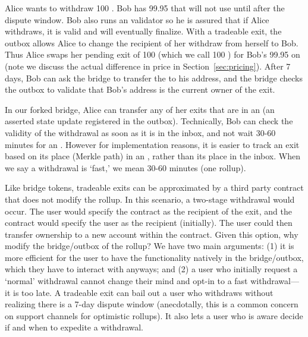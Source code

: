 Alice wants to withdraw 100 \ethtwo. Bob has 99.95 \ethone that will not use until after the dispute window. Bob also runs an \layertwo validator so he is assured that if Alice withdraws, it is valid and will eventually finalize. With a tradeable exit, the outbox allows Alice to change the recipient of her withdraw from herself to Bob. Thus Alice swaps her pending exit of 100 \ethone (which we call 100 \ethxx) for Bob's 99.95 \ethone on \layerone (note we discuss the actual difference in price in Section~\ref{sec:pricing}). After 7 days, Bob can ask the bridge to transfer the \ethone to his address, and the bridge checks the outbox to validate that Bob's address is the current owner of the exit.

In our forked bridge, Alice can transfer any of her exits that are in an \rblock (\ie an asserted \layertwo state update registered in the outbox). Technically, Bob can check the validity of the withdrawal as soon as it is in the inbox, and not wait 30-60 minutes for an \rblock. However for implementation reasons, it is easier to track an exit based on its place (\ie Merkle path) in an \rblock, rather than its place in the inbox. When we say a withdrawal is `fast,' we mean 30-60 minutes (\ie one \layertwo rollup). 

Like bridge tokens, tradeable exits can be approximated by a third party \layerone contract that does not modify the rollup. In this scenario, a two-stage withdrawal would occur. The user would specify the contract as the recipient of the exit, and the contract would specify the user as the recipient (initially). The user could then transfer ownership to a new account within the contract. Given this option, why modify the bridge/outbox of the rollup? We have two main arguments: (1) it is more efficient for the user to have the functionality natively in the bridge/outbox, which they have to interact with anyways; and (2) a user who initially request a `normal' withdrawal cannot change their mind and opt-in to a fast withdrawal---it is too late. A tradeable exit can bail out a user who withdraws without realizing there is a 7-day dispute window (anecdotally, this is a common concern on support channels for optimistic rollups). It also lets a user who is aware decide if and when to expedite a withdrawal. 

